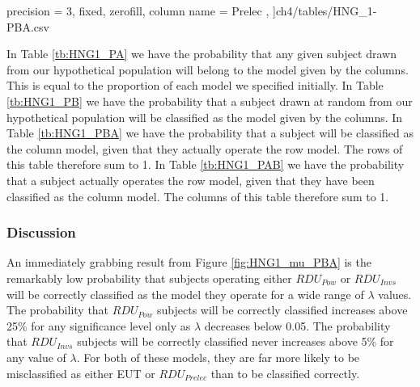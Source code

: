 \documentclass[../main.tex]{subfiles}
\begin{document}
{\begin{table}[ht!]
\begin{adjustbox}{}
{			precision = 3,
			fixed,
			zerofill,
			column name = {Prelec}
		},
	]{ch4/tables/HNG_1-PBA.csv} %
	\end{adjustbox}
\end{table}
\begin{table}[ht!]
	\centering
	\captionsetup{justification=centering}
	\caption{$P(A | B)$}
	\label{tb:HNG1_PAB}
	\begin{adjustbox}{}
	\end{adjustbox}
\end{table}
}

\break

In Table \ref{tb:HNG1_PA} we have the probability that any given subject drawn from our hypothetical population will belong to the model given by the columns.
This is equal to the proportion of each model we specified initially.
In Table \ref{tb:HNG1_PB} we have the probability that a subject drawn at random from our hypothetical population will be classified as the model given by the columns.
In Table \ref{tb:HNG1_PBA} we have the probability that a subject will be classified as the column model, given that they actually operate the row model.
The rows of this table therefore sum to 1.
In Table \ref{tb:HNG1_PAB} we have the probability that a subject actually operates the row model, given that they have been classified as the column model.
The columns of this table therefore sum to 1.

\subsubsection{Discussion}

An immediately grabbing result from Figure \ref{fig:HNG1_mu_PBA} is the remarkably low probability that subjects operating either $\mathit{RDU_{Pow}}$ or $\mathit{RDU_{Invs}}$ will be correctly classified as the model they operate for a wide range of $\lambda$ values.
The probability that $\mathit{RDU_{Pow}}$ subjects will be correctly classified increases above 25\% for any significance level only as $\lambda$ decreases below 0.05.
The probability that $\mathit{RDU_{Invs}}$ subjects will be correctly classified never increases above 5\% for any value of $\lambda$.
For both of these models, they are far more likely to be misclassified as either EUT or $\mathit{RDU_{Prelec}}$ than to be classified correctly.
\end{document}
